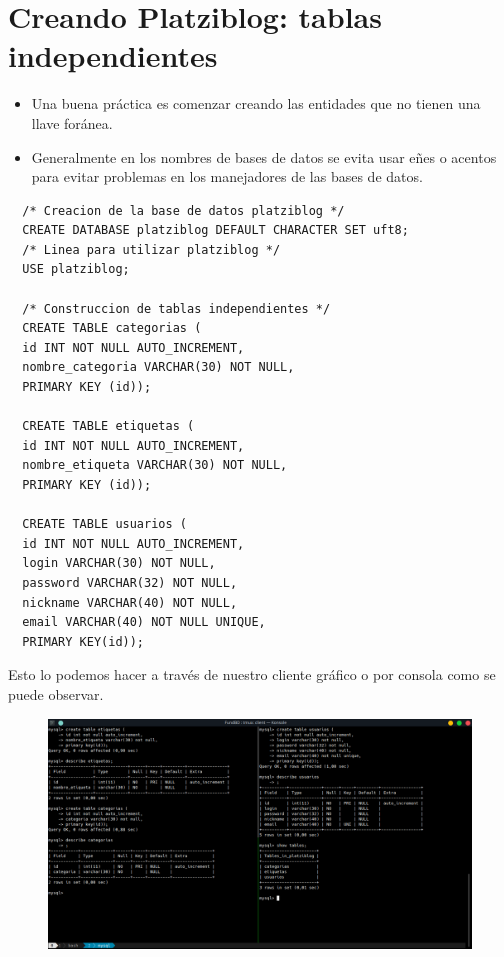 \documentclass{article}
\begin{document}
\section{Creando Platziblog: tablas independientes}%
\begin{itemize}
  \item Una buena práctica es comenzar creando las entidades que no tienen una
    llave foránea.
  \item Generalmente en los nombres de bases de datos se evita usar eñes o
    acentos para evitar problemas en los manejadores de las bases de datos.
\end{itemize}

\begin{verbatim}
  /* Creacion de la base de datos platziblog */
  CREATE DATABASE platziblog DEFAULT CHARACTER SET uft8;
  /* Linea para utilizar platziblog */
  USE platziblog;
  
  /* Construccion de tablas independientes */
  CREATE TABLE categorias (
  id INT NOT NULL AUTO_INCREMENT,
  nombre_categoria VARCHAR(30) NOT NULL,
  PRIMARY KEY (id));

  CREATE TABLE etiquetas (
  id INT NOT NULL AUTO_INCREMENT,
  nombre_etiqueta VARCHAR(30) NOT NULL,
  PRIMARY KEY (id));

  CREATE TABLE usuarios (
  id INT NOT NULL AUTO_INCREMENT,
  login VARCHAR(30) NOT NULL,
  password VARCHAR(32) NOT NULL,
  nickname VARCHAR(40) NOT NULL,
  email VARCHAR(40) NOT NULL UNIQUE,
  PRIMARY KEY(id));
\end{verbatim}

Esto lo podemos hacer a través de nuestro cliente gráfico o por consola como se puede observar.

\begin{figure}[h!]
  \centering
  \includegraphics[scale=0.50]{./Pictures/067_platziblog_ti.png}
\end{figure}
\end{document}
